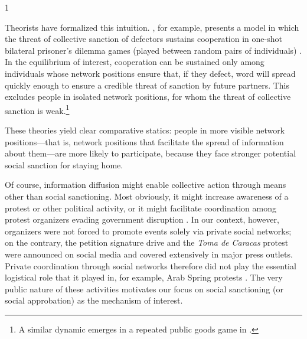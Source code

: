 \documentclass[12pt]{article}
\newcommand{\jop}{0} %
\begin{document}
\if\jop1
\linespread{2}\selectfont
\fi

Theorists have formalized this intuition. \citet{Larson:2014ve}, for example, presents a model in which the threat of collective sanction of defectors sustains cooperation in one-shot bilateral prisoner's dilemma games (played between random pairs of individuals) \citep[\`{a} la][]{Kandori:1992fk}. In the equilibrium of interest, cooperation can be sustained only among individuals whose network positions ensure that, if they defect, word will spread quickly enough to ensure a credible threat of sanction by future partners. This excludes people in isolated network positions, for whom the threat of collective sanction is weak.\footnote{A similar dynamic emerges in a repeated public goods game in \citet{wolitzky2012}.}

These theories yield clear comparative statics: people in more visible network positions---that is, network positions that facilitate the spread of information about them---are more likely to participate, because they face stronger potential social sanction for staying home.

Of course, information diffusion might enable collective action through means other than social sanctioning. Most obviously, it might increase awareness of a protest or other political activity, or it might facilitate coordination among protest organizers evading government disruption \citep{Little:2015jo,Christensen:2018vd,EnikopolovVK}. In our context, however, organizers were not forced to promote events solely via private social networks; on the contrary, the petition signature drive and the \emph{Toma de Caracas} protest were announced on social media and covered extensively in major press outlets. Private coordination through social networks therefore did not play the essential logistical role that it played in, for example, Arab Spring protests \citep{SteinertThrelkeld:2017dy,SteinertThrelkeld:2015vu}. The very public nature of these activities motivates our focus on social sanctioning (or social approbation) as the mechanism of interest.
\end{document}
